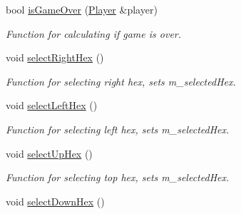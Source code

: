 \begin{DoxyCompactItemize}
bool \hyperlink{classBoard_abad74f5252ffa218f83411012f977ed9}{is\+Game\+Over} (\hyperlink{classPlayer}{Player} \&player)
\begin{DoxyCompactList}\small\item\em Function for calculating if game is over. \end{DoxyCompactList}\item 
void \hyperlink{classBoard_a50010e64ff87ce497aea5f2739ba3884}{select\+Right\+Hex} ()\hypertarget{classBoard_a50010e64ff87ce497aea5f2739ba3884}{}\label{classBoard_a50010e64ff87ce497aea5f2739ba3884}

\begin{DoxyCompactList}\small\item\em Function for selecting right hex, sets m\+\_\+selected\+Hex. \end{DoxyCompactList}\item 
void \hyperlink{classBoard_ae6bb9e11880db637317626c9f64af199}{select\+Left\+Hex} ()\hypertarget{classBoard_ae6bb9e11880db637317626c9f64af199}{}\label{classBoard_ae6bb9e11880db637317626c9f64af199}

\begin{DoxyCompactList}\small\item\em Function for selecting left hex, sets m\+\_\+selected\+Hex. \end{DoxyCompactList}\item 
void \hyperlink{classBoard_afc8936abe71f811d57228aae3c4884f6}{select\+Up\+Hex} ()\hypertarget{classBoard_afc8936abe71f811d57228aae3c4884f6}{}\label{classBoard_afc8936abe71f811d57228aae3c4884f6}

\begin{DoxyCompactList}\small\item\em Function for selecting top hex, sets m\+\_\+selected\+Hex. \end{DoxyCompactList}\item 
void \hyperlink{classBoard_a6d45d92b74061bc3f96930400971f405}{select\+Down\+Hex} ()\hypertarget{classBoard_a6d45d92b74061bc3f96930400971f405}{}\label{classBoard_a6d45d92b74061bc3f96930400971f405}


\end{DoxyCompactItemize}
